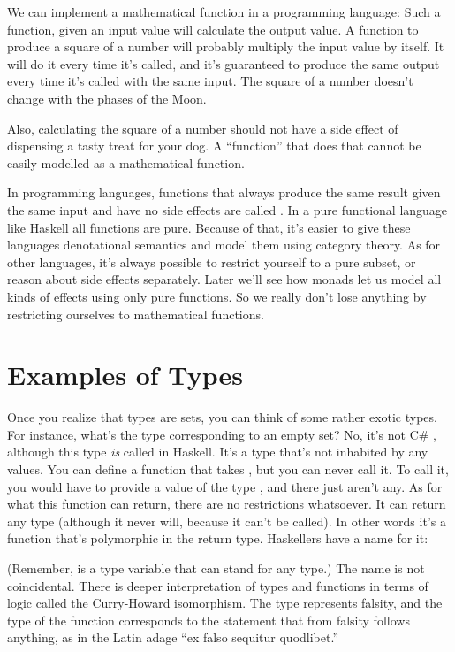 We can implement a mathematical function in a programming language: Such
a function, given an input value will calculate the output value. A
function to produce a square of a number will probably multiply the
input value by itself. It will do it every time it's called, and it's
guaranteed to produce the same output every time it's called with the
same input. The square of a number doesn't change with the phases of the
Moon.

Also, calculating the square of a number should not have a side effect
of dispensing a tasty treat for your dog. A ``function'' that does that
cannot be easily modelled as a mathematical function.

In programming languages, functions that always produce the same result
given the same input and have no side effects are called . In a pure functional language like Haskell all functions are
pure. Because of that, it's easier to give these languages denotational
semantics and model them using category theory. As for other languages,
it's always possible to restrict yourself to a pure subset, or reason
about side effects separately. Later we'll see how monads let us model
all kinds of effects using only pure functions. So we really don't lose
anything by restricting ourselves to mathematical functions.

\section{Examples of Types}

Once you realize that types are sets, you can think of some rather
exotic types. For instance, what's the type corresponding to an empty
set? No, it's not C\# , although this type \emph{is} called
 in Haskell. It's a type that's not inhabited by any
values. You can define a function that takes , but you can
never call it. To call it, you would have to provide a value of the type
, and there just aren't any. As for what this function can
return, there are no restrictions whatsoever. It can return any type
(although it never will, because it can't be called). In other words
it's a function that's polymorphic in the return type. Haskellers have a
name for it:

(Remember,  is a type variable that can stand for any type.)
The name is not coincidental. There is deeper interpretation of types
and functions in terms of logic called the Curry-Howard isomorphism. The
type  represents falsity, and the type of the function
 corresponds to the statement that from falsity follows
anything, as in the Latin adage ``ex falso sequitur quodlibet.''


